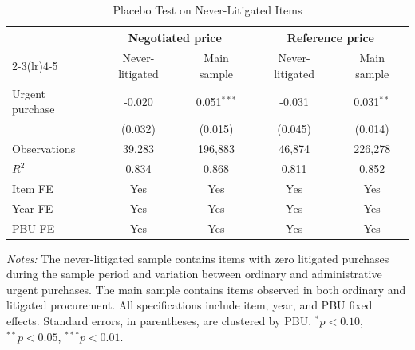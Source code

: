 \begin{table}[ht]
\centering
\caption{Placebo Test on Never-Litigated Items}
\label{tab:placebo}
\begin{threeparttable}
\small
\setlength{\tabcolsep}{5pt}
\begin{tabular}{lcccc}
\toprule
 & \multicolumn{2}{c}{Negotiated price} & \multicolumn{2}{c}{Reference price} \\
\cmidrule(lr){2-3}\cmidrule(lr){4-5}
 & Never-litigated & Main sample & Never-litigated & Main sample \\
\midrule
Urgent purchase & -0.020 & 0.051$^{***}$ & -0.031 & 0.031$^{**}$ \\
 & (0.032) & (0.015) & (0.045) & (0.014) \\
\addlinespace
Observations & 39{,}283 & 196{,}883 & 46{,}874 & 226{,}278 \\
$R^2$ & 0.834 & 0.868 & 0.811 & 0.852 \\
Item FE & Yes & Yes & Yes & Yes \\
Year FE & Yes & Yes & Yes & Yes \\
PBU FE & Yes & Yes & Yes & Yes \\
\bottomrule
\end{tabular}
\begin{tablenotes}[flushleft]\footnotesize
\item \textit{Notes:} The never-litigated sample contains items with zero litigated purchases during the sample period and variation between ordinary and administrative urgent purchases. The main sample contains items observed in both ordinary and litigated procurement. All specifications include item, year, and PBU fixed effects. Standard errors, in parentheses, are clustered by PBU. $^{*}p<0.10$, $^{**}p<0.05$, $^{***}p<0.01$.
\end{tablenotes}
\end{threeparttable}
\end{table}
